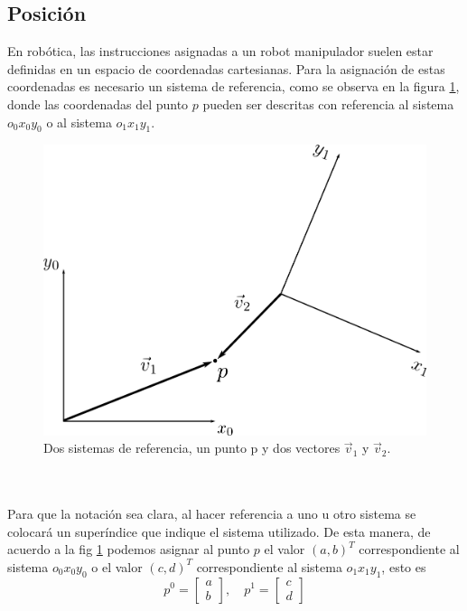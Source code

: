 \subsection{Posición}

En robótica, las instrucciones asignadas a un robot manipulador suelen estar definidas en un espacio de coordenadas cartesianas. Para la asignación de estas coordenadas es necesario un sistema de referencia, como se observa en la figura \ref{sistemasdereferencia}, donde las coordenadas del punto $p$ pueden ser descritas con referencia al sistema $o_{0}x_{0}y_{0}$ o al sistema $o_{1}x_{1}y_{1}$.
\begin{figure}[h!]
	\centering
	\includegraphics[scale=0.3]{Capitulo2/figs/SistemaPuntoVectores.png} 
	\caption{Dos sistemas de referencia, un punto p y dos vectores $\vec{v}_{1}$ y $\vec{v}_{2}$.}
	\label{sistemasdereferencia}
\end{figure}
\\\\Para que la notación sea clara, al hacer referencia a uno u otro sistema se colocará un superíndice que indique el sistema utilizado. De esta manera, de acuerdo a la fig \ref{sistemasdereferencia} podemos asignar al punto $p$ el valor $(a,b)^T$ correspondiente al sistema $o_{0}x_{0}y_{0}$  o el valor $(c,d)^T$ correspondiente al sistema $o_{1}x_{1}y_{1}$, esto es
\[
p^{0}=
\begin{bmatrix} 
a  \\
b
\end{bmatrix}
,\quad
p^{1}=
\begin{bmatrix} 
c  \\
d
\end{bmatrix}
\]

